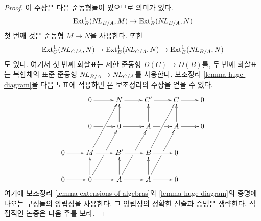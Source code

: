 \begin{proof}
이 주장은 다음 준동형들이 있으므로 의미가 있다.
$$
\mathop{\mathrm{Ext}}\nolimits^1_B(\mathop{N\!L}\nolimits_{B/A}, M) \to \mathop{\mathrm{Ext}}\nolimits^1_B(\mathop{N\!L}\nolimits_{B/A}, N)
$$
첫 번째 것은 준동형 $M\to N$을 사용한다. 또한
$$
\mathop{\mathrm{Ext}}\nolimits^1_C(\mathop{N\!L}\nolimits_{C/A}, N) \to \mathop{\mathrm{Ext}}\nolimits^1_B(\mathop{N\!L}\nolimits_{C/A}, N) \to \mathop{\mathrm{Ext}}\nolimits^1_B(\mathop{N\!L}\nolimits_{B/A}, N)
$$
도 있다. 여기서 첫 번째 화살표는 제한 준동형 $D(C)\to D(B)$를,
두 번째 화살표는 복합체의 표준 준동형
$\mathop{N\!L}\nolimits_{B/A}\to\mathop{N\!L}\nolimits_{C/A}$를 사용한다. 보조정리 \ref{lemma-huge-diagram}을
다음 도표에 적용하면 본 보조정리의 주장을 얻을 수 있다.
$$
\xymatrix{
& 0 \ar[r] & N \ar[r] & C' \ar[r] & C \ar[r] & 0 \\
& 0 \ar[r]|\hole & 0 \ar[u] \ar[r] &
A \ar[u] \ar[r]|\hole & A \ar[u] \ar[r] & 0 \\
0 \ar[r] & M \ar[ruu] \ar[r] & B' \ar[r] & B \ar[ruu] \ar[r] & 0 \\
0 \ar[r] & 0 \ar[ruu]|\hole \ar[u] \ar[r] &
A \ar[ruu]|\hole \ar[u] \ar[r] & A \ar[ruu]|\hole \ar[u] \ar[r] & 0
}
$$
여기에 보조정리 \ref{lemma-extensions-of-algebras}와
\ref{lemma-huge-diagram}의 증명에 나오는 구성들의 양립성을 사용한다.
그 양립성의 정확한 진술과 증명은 생략한다. 직접적인 논증은 다음 주를 보라.
\end{proof}

